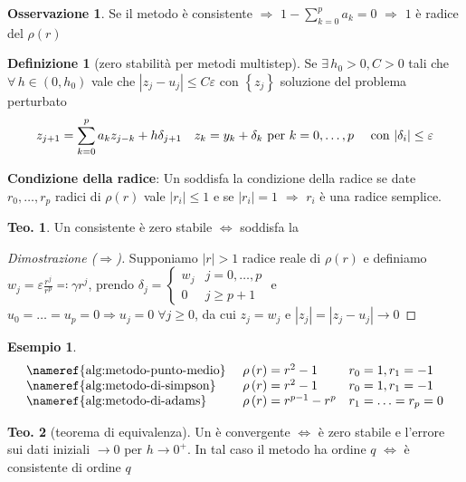 \documentclass[a4paper,10pt]{article}
\theoremstyle{definition}
\theoremstyle{indentdefinition}
\newtheorem{defn}{Definizione}[section]
\theoremstyle{indenttheorem}
\newtheorem{thm}{Teo.}
\theoremstyle{myremark}
\newtheorem*{rem*}{Osservazione}
\newtheorem{example*}{Esempio}
\theoremstyle{indentgeneral}
\theoremstyle{plain}
\theoremstyle{plain}
\begin{document}
\begin{rem*}
Se il metodo è consistente $\Longrightarrow$ $1-\sum_{k=0}^{p}a_{k}=0$
$\Longrightarrow$ $1$ è radice del 
$\rho\left(r\right)$
\end{rem*}
\begin{defn}[zero stabilità per metodi multistep]
Se $\exists\,h_{0}>0,C>0$ tali che $\forall\,h\in\left(0,h_{0}\right)$
vale che $\left|z_{j}-u_{j}\right|\leq C\varepsilon$ con $\left\{ z_{j}\right\} $
soluzione del problema perturbato
\begin{align*}
z_{j+1} & =\sum_{k=0}^{p}a_{k}z_{j-k}+h\delta_{j+1} & z_{k} & =y_{k}+\delta_{k}\text{ per \ensuremath{k=0,\ldots,p}} & \text{ con \ensuremath{\left|\delta_{i}\right|\leq\varepsilon}}
\end{align*}
\end{defn}

\textbf{Condizione della radice}:
\label{cond:condizione-della-radice}Un 
soddisfa la condizione della radice se date $r_{0},\ldots,r_{p}$
radici di $\rho\left(r\right)$ vale $\left|r_{i}\right|\leq1$ e
se $\left|r_{i}\right|=1$ $\Rightarrow$ $r_{i}$ è una radice semplice.


\begin{thm}
Un  consistente è zero stabile $\Longleftrightarrow$
soddisfa la 
\end{thm}

\begin{proof}[Dimostrazione ($\Longrightarrow$)]
Supponiamo $\left|r\right|>1$ radice reale di $\rho\left(r\right)$
e definiamo $w_{j}=\varepsilon\frac{r^{j}}{r^{p}}\eqqcolon\gamma r^{j}$,
prendo $\delta_{j}=\begin{cases}
w_{j} & j=0,\ldots,p\\
0 & j\geq p+1
\end{cases}$ e $u_{0}=\ldots=u_{p}=0\Longrightarrow u_{j}=0\;\forall j\geq0$,
da cui $z_{j}=w_{j}$ e $\left|z_{j}\right|=\left|z_{j}-u_{j}\right|\longrightarrow0$
\end{proof}
\begin{example*}
\[
\begin{array}{lll}
\text{\nameref{alg:metodo-punto-medio} } & \rho\left(r\right)=r^{2}-1 & r_{0}=1,r_{1}=-1\\
\text{\nameref{alg:metodo-di-simpson} } & \rho\left(r\right)=r^{2}-1 & r_{0}=1,r_{1}=-1\\
\text{\nameref{alg:metodo-di-adams} } & \rho\left(r\right)=r^{p-1}-r^{p} & r_{1}=\ldots=r_{p}=0
\end{array}
\]
\end{example*}
\begin{thm}[teorema di equivalenza]
Un  è convergente $\Longleftrightarrow$
è zero stabile e l'errore sui dati iniziali $\rightarrow0$ per $h\rightarrow0^{+}$.
In tal caso il metodo ha ordine $q$ $\Longleftrightarrow$ è consistente
di ordine $q$
\end{thm}
\end{document}

